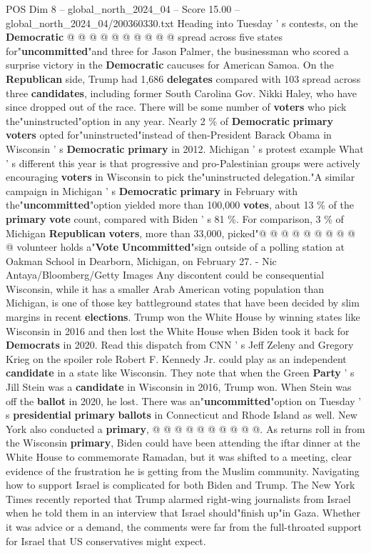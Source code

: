 \begin{textsample}{POS Dim 8 – global\_north\_2024\_04 – Score 15.00 – global\_north\_2024\_04/200360330.txt}
Heading into Tuesday ' s contests, on the \textbf{Democratic} @ @ @ @ @ @ @ @ @ @ spread across five states for"\textbf{uncommitted}"and three for Jason Palmer, the businessman who scored a surprise victory in the \textbf{Democratic} caucuses for American Samoa.
On the \textbf{Republican} side, Trump had 1,686 \textbf{delegates} compared with 103 spread across three \textbf{candidates}, including former South Carolina Gov.
Nikki Haley, who have since dropped out of the race.
There will be some number of \textbf{voters} who pick the"uninstructed"option in any year.
Nearly 2 \% of \textbf{Democratic} \textbf{primary} \textbf{voters} opted for"uninstructed"instead of then-President Barack Obama in Wisconsin ' s \textbf{Democratic} \textbf{primary} in 2012.
Michigan ' s protest example What ' s different this year is that progressive and pro-Palestinian groups were actively encouraging \textbf{voters} in Wisconsin to pick the"uninstructed delegation."A similar campaign in Michigan ' s \textbf{Democratic} \textbf{primary} in February with the"\textbf{uncommitted}"option yielded more than 100,000 \textbf{votes}, about 13 \% of the \textbf{primary} \textbf{vote} count, compared with Biden ' s 81 \%.
For comparison, 3 \% of Michigan \textbf{Republican} \textbf{voters}, more than 33,000, picked"@ @ @ @ @ @ @ @ @ @ volunteer holds a"\textbf{Vote} \textbf{Uncommitted}"sign outside of a polling station at Oakman School in Dearborn, Michigan, on February 27. - Nic Antaya/Bloomberg/Getty Images Any discontent could be consequential Wisconsin, while it has a smaller Arab American voting population than Michigan, is one of those key battleground states that have been decided by slim margins in recent \textbf{elections}.
Trump won the White House by winning states like Wisconsin in 2016 and then lost the White House when Biden took it back for \textbf{Democrats} in 2020.
Read this dispatch from CNN ' s Jeff Zeleny and Gregory Krieg on the spoiler role Robert F.
Kennedy Jr. could play as an independent \textbf{candidate} in a state like Wisconsin.
They note that when the Green \textbf{Party} ' s Jill Stein was a \textbf{candidate} in Wisconsin in 2016, Trump won.
When Stein was off the \textbf{ballot} in 2020, he lost.
There was an"\textbf{uncommitted}"option on Tuesday ' s \textbf{presidential} \textbf{primary} \textbf{ballots} in Connecticut and Rhode Island as well.
New York also conducted a \textbf{primary}, @ @ @ @ @ @ @ @ @ @.
As returns roll in from the Wisconsin \textbf{primary}, Biden could have been attending the iftar dinner at the White House to commemorate Ramadan, but it was shifted to a meeting, clear evidence of the frustration he is getting from the Muslim community.
Navigating how to support Israel is complicated for both Biden and Trump.
The New York Times recently reported that Trump alarmed right-wing journalists from Israel when he told them in an interview that Israel should"finish up"in Gaza.
Whether it was advice or a demand, the comments were far from the full-throated support for Israel that US conservatives might expect.


\end{textsample}
